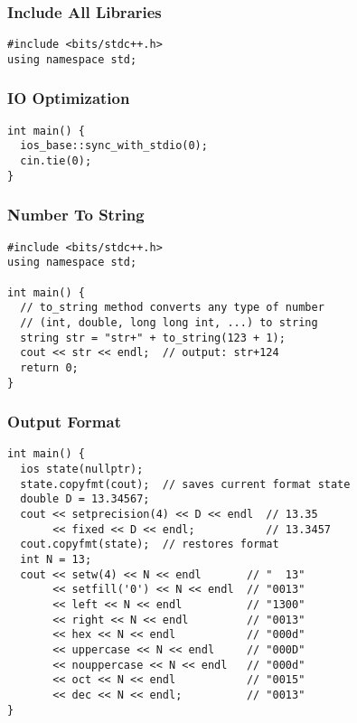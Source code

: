 \documentclass[twoside]{article}
\begin{document}
\begin{multicols*}{2}
\subsubsectionfont{\large\bfseries\sffamily\underline}
\subsubsection*{Include All Libraries}
\begin{verbatim}
#include <bits/stdc++.h>
using namespace std;
\end{verbatim}

\subsubsectionfont{\large\bfseries\sffamily\underline}
\subsubsection*{IO Optimization}
\begin{verbatim}
int main() {
  ios_base::sync_with_stdio(0);
  cin.tie(0);
}
\end{verbatim}

\subsubsectionfont{\large\bfseries\sffamily\underline}
\subsubsection*{Number To String}
\begin{verbatim}
#include <bits/stdc++.h>
using namespace std;

int main() {
  // to_string method converts any type of number
  // (int, double, long long int, ...) to string
  string str = "str+" + to_string(123 + 1);
  cout << str << endl;  // output: str+124
  return 0;
}
\end{verbatim}

\subsubsectionfont{\large\bfseries\sffamily\underline}
\subsubsection*{Output Format}
\begin{verbatim}
int main() {
  ios state(nullptr);
  state.copyfmt(cout);  // saves current format state
  double D = 13.34567;
  cout << setprecision(4) << D << endl  // 13.35
       << fixed << D << endl;           // 13.3457
  cout.copyfmt(state);  // restores format
  int N = 13;
  cout << setw(4) << N << endl       // "  13"
       << setfill('0') << N << endl  // "0013"
       << left << N << endl          // "1300"
       << right << N << endl         // "0013"
       << hex << N << endl           // "000d"
       << uppercase << N << endl     // "000D"
       << nouppercase << N << endl   // "000d"
       << oct << N << endl           // "0015"
       << dec << N << endl;          // "0013"
}
\end{verbatim}


\end{multicols*}
\end{document}
